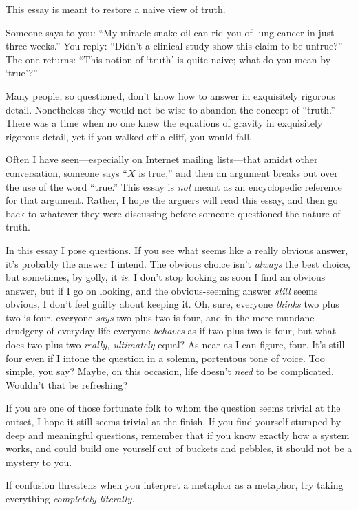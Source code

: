 {
 This essay is meant to restore a naive view of truth.}

{
 Someone says to you: ``My miracle snake oil can
rid you of lung cancer in just three weeks.'' You
reply: ``Didn't a clinical study show
this claim to be untrue?'' The one returns:
``This notion of
`truth' is quite naive; what do you mean
by `true'?''}

{
 Many people, so questioned, don't know how to
answer in exquisitely rigorous detail. Nonetheless they would not be
wise to abandon the concept of
``truth.'' There was a time when no
one knew the equations of gravity in exquisitely rigorous detail, yet
if you walked off a cliff, you would fall.}

{
 Often I have seen---especially on Internet mailing lists---that
amidst other conversation, someone says ``$X$ is
true,'' and then an argument breaks out over the use
of the word ``true.'' This essay is
\textit{not} meant as an encyclopedic reference for that argument.
Rather, I hope the arguers will read this essay, and then go back to
whatever they were discussing before someone questioned the nature of
truth.}

{
 In this essay I pose questions. If you see what seems like a
really obvious answer, it's probably the answer I
intend. The obvious choice isn't \textit{always} the
best choice, but sometimes, by golly, it \textit{is}. I
don't stop looking as soon I find an obvious answer,
but if I go on looking, and the obvious-seeming answer \textit{still}
seems obvious, I don't feel guilty about keeping it.
Oh, sure, everyone \textit{thinks} two plus two is four, everyone
\textit{says} two plus two is four, and in the mere mundane drudgery of
everyday life everyone \textit{behaves} as if two plus two is four, but
what does two plus two \textit{really, ultimately} equal? As near as I
can figure, four. It's still four even if I intone the
question in a solemn, portentous tone of voice. Too simple, you say?
Maybe, on this occasion, life doesn't \textit{need} to
be complicated. Wouldn't that be refreshing?}

{
 If you are one of those fortunate folk to whom the question seems
trivial at the outset, I hope it still seems trivial at the finish. If
you find yourself stumped by deep and meaningful questions, remember
that if you know exactly how a system works, and could build one
yourself out of buckets and pebbles, it should not be a mystery to
you.}

{
 If confusion threatens when you interpret a metaphor as a
metaphor, try taking everything \textit{completely literally.}}

